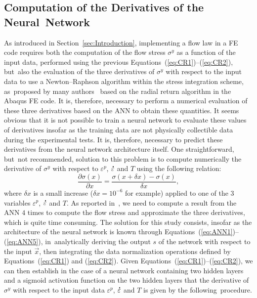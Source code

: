 \documentclass[algorithms,article,accept,pdftex,moreauthors]{Definitions/mdpi}
\DeclareRobustCommand{\mdot}[1]{\accentset{\mbox{\bfseries .}}{#1}}
\begin{document}
\subsection{Computation of the Derivatives of the Neural~Network}\label{sec:ANN-derivative}

As introduced in Section~\ref{sec:Introduction}, implementing a flow law in a FE code requires both the computation of the flow stress $\sigma^y$ as a function of the input data, performed using the previous Equations~(\ref{eq:CR1})--(\ref{eq:CR2}), but~also the evaluation of the three derivatives of $\sigma^y$ with respect to the input data to use a Newton--Raphson algorithm within the stress integration scheme, as~proposed by many authors~\cite{Ponthot-2002, Ming-2018, Liang-2022, Simo-1998} based on the radial return algorithm in the Abaqus FE code.
It is, therefore, necessary to perform a numerical evaluation of these three derivatives based on the ANN to obtain these quantities.
It seems obvious that it is not possible to train a neural network to evaluate these values of derivatives insofar as the training data are not physically collectible data during the experimental tests.
It is, therefore, necessary to predict these derivatives from the neural network architecture itself.
One straightforward, but~not recommended, solution to this problem is to compute numerically the derivative of $\sigma^y$ with respect to $\varepsilon^p$, $\mdot\varepsilon$ and $T$ using the following relation:
\begin{equation}
\frac{\partial \sigma(x)}{\partial x} = \frac{\sigma(x+\delta x) - \sigma(x)}{\delta x},
\end{equation}
where $\delta x$ is a small increase ($\delta x=10^{-6}$ for example) applied to one of the $3$ variables $\varepsilon^p$, $\mdot\varepsilon$ and $T$.
As reported in~\cite{Pantale-2021}, we need to compute a result from the ANN  $4$ times to compute the flow stress and approximate the three derivatives, which is quite time consuming.
The solution for this study consists, insofar as the architecture of the neural network is known through Equations~(\ref{eq:ANN1})--(\ref{eq:ANN5}), in~analytically deriving the output $s$ of the network with respect to the input $\overrightarrow{x}$, then integrating the data normalization operations defined by Equations~(\ref{eq:CR1}) and (\ref{eq:CR2}).
Given Equations~(\ref{eq:CR1})--(\ref{eq:CR2}), we can then establish in the case of a neural network containing two hidden layers and a sigmoid activation function on the two hidden layers that the derivative of $\sigma^y$ with respect to the input data $\varepsilon^p$, $\mdot\varepsilon$ and $T$ is given by the following~procedure.
\end{document}
